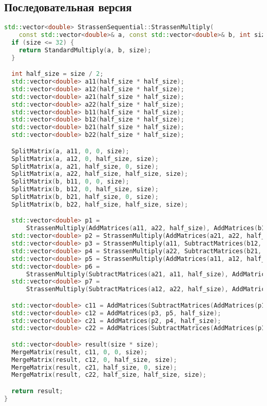 \documentclass[14pt,a4paper]{extarticle}
\begin{document}
\subsection{Последовательная версия}
\begin{lstlisting}[language=C++]
std::vector<double> StrassenSequential::StrassenMultiply(
    const std::vector<double>& a, const std::vector<double>& b, int size) {
  if (size <= 32) {
    return StandardMultiply(a, b, size);
  }

  int half_size = size / 2;
  std::vector<double> a11(half_size * half_size);
  std::vector<double> a12(half_size * half_size);
  std::vector<double> a21(half_size * half_size);
  std::vector<double> a22(half_size * half_size);
  std::vector<double> b11(half_size * half_size);
  std::vector<double> b12(half_size * half_size);
  std::vector<double> b21(half_size * half_size);
  std::vector<double> b22(half_size * half_size);

  SplitMatrix(a, a11, 0, 0, size);
  SplitMatrix(a, a12, 0, half_size, size);
  SplitMatrix(a, a21, half_size, 0, size);
  SplitMatrix(a, a22, half_size, half_size, size);
  SplitMatrix(b, b11, 0, 0, size);
  SplitMatrix(b, b12, 0, half_size, size);
  SplitMatrix(b, b21, half_size, 0, size);
  SplitMatrix(b, b22, half_size, half_size, size);

  std::vector<double> p1 =
      StrassenMultiply(AddMatrices(a11, a22, half_size), AddMatrices(b11, b22, half_size), half_size);
  std::vector<double> p2 = StrassenMultiply(AddMatrices(a21, a22, half_size), b11, half_size);
  std::vector<double> p3 = StrassenMultiply(a11, SubtractMatrices(b12, b22, half_size), half_size);
  std::vector<double> p4 = StrassenMultiply(a22, SubtractMatrices(b21, b11, half_size), half_size);
  std::vector<double> p5 = StrassenMultiply(AddMatrices(a11, a12, half_size), b22, half_size);
  std::vector<double> p6 =
      StrassenMultiply(SubtractMatrices(a21, a11, half_size), AddMatrices(b11, b12, half_size), half_size);
  std::vector<double> p7 =
      StrassenMultiply(SubtractMatrices(a12, a22, half_size), AddMatrices(b21, b22, half_size), half_size);

  std::vector<double> c11 = AddMatrices(SubtractMatrices(AddMatrices(p1, p4, half_size), p5, half_size), p7, half_size);
  std::vector<double> c12 = AddMatrices(p3, p5, half_size);
  std::vector<double> c21 = AddMatrices(p2, p4, half_size);
  std::vector<double> c22 = AddMatrices(SubtractMatrices(AddMatrices(p1, p3, half_size), p2, half_size), p6, half_size);

  std::vector<double> result(size * size);
  MergeMatrix(result, c11, 0, 0, size);
  MergeMatrix(result, c12, 0, half_size, size);
  MergeMatrix(result, c21, half_size, 0, size);
  MergeMatrix(result, c22, half_size, half_size, size);

  return result;
}
\end{lstlisting}
\end{document}
